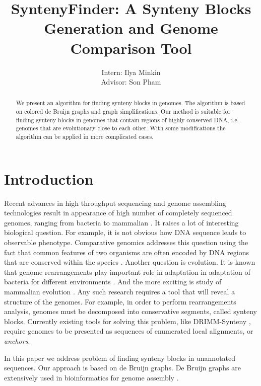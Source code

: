 \documentclass[a4paper, 12pt]{scrartcl}
\begin{document}
\title{SyntenyFinder: A Synteny Blocks Generation and Genome Comparison Tool}
\author{Intern: Ilya Minkin\\
	Advisor: Son Pham}
\date{}
\maketitle
{}

\linespread{1.3}

\begin{abstract}
We present an algorithm for finding synteny blocks in genomes. The algorithm is based on colored de Bruijn graphs and graph simplifications.
Our method is suitable for finding synteny blocks in genomes that contain regions of highly conserved DNA, i.e. genomes that are evolutionary
close to each other. With some modifications the algorithm can be applied in more complicated cases.
\end{abstract}

\section{Introduction}

Recent advances in high throughput sequencing and genome assembling technologies result in appearance of high number of
completely sequenced genomes, ranging from bacteria to mammalian \cite{Genome10K}. It raises a lot of interesting 
biological question. For example, it is not obvious how DNA sequence leads to observable phenotype. Comparative genomics
addresses this question using the fact that common features of two organisms are often encoded by DNA regions that are conserved
within the species \cite{ComparativeGenomics}. Another question is evolution. It is known that genome rearrangements play important role in adaptation in adaptation of bacteria
for different environments \cite{GenomeEvolutionAdaptation}. And the more exciting is study of mammalian evolution \cite{HumanMouse}.
Any such research requires a tool that will reveal a structure of the genomes. For example, in order to perform rearrangements analysis, genomes must be decomposed into
conservative segments, called synteny blocks. Currently existing tools for solving this problem, like DRIMM-Synteny
\cite{Pham2010}, require genomes to be presented as sequences of enumerated local alignments, or \textit{anchors}.

In this paper we address problem of finding synteny blocks in unannotated sequences. Our approach is based on de Bruijn graphs.
De Bruijn graphs are extensively used in bioinformatics for genome assembly \cite{Pevzner2001, Iqbal2012}. 
\end{document}

